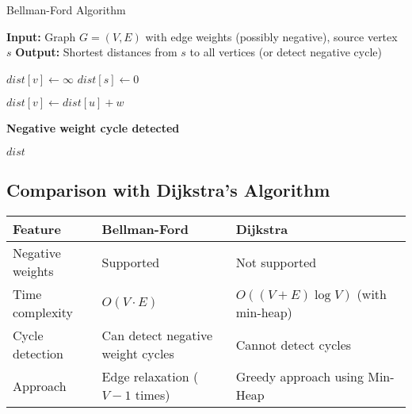 \documentclass[14pt,a4paper]{extarticle}
\begin{document}
\begin{algorithm}[H]
\caption{Bellman-Ford Algorithm}
\begin{algorithmic}[1]
\State \textbf{Input:} Graph $G = (V, E)$ with edge weights (possibly negative), source vertex $s$
\State \textbf{Output:} Shortest distances from $s$ to all vertices (or detect negative cycle)

        \State $dist[v] \gets \infty$
    \EndFor
    \State $dist[s] \gets 0$

                \State $dist[v] \gets dist[u] + w$
            \EndIf
        \EndFor
    \EndFor

            \State \Return \textbf{Negative weight cycle detected}
        \EndIf
    \EndFor

    \State \Return $dist$
\EndFunction
\end{algorithmic}
\end{algorithm}

\subsection{Comparison with Dijkstra's Algorithm}
\begin{table}[H]
\centering
\renewcommand{\arraystretch}{1.4}
\begin{tabular}{|>{\raggedright\arraybackslash}p{4cm}|
                >{\raggedright\arraybackslash}p{5.5cm}|
                >{\raggedright\arraybackslash}p{5.5cm}|}
\hline
\textbf{Feature} & \textbf{Bellman-Ford} & \textbf{Dijkstra} \\
\hline
Negative weights & Supported & Not supported \\
\hline
Time complexity  & $O(V \cdot E)$ & $O((V + E)\log V)$ (with min-heap) \\
\hline
Cycle detection  & Can detect negative weight cycles & Cannot detect cycles \\
\hline
Approach         & Edge relaxation ($V - 1$ times) & Greedy approach using Min-Heap \\
\hline
\end{tabular}
\end{table}

\end{document}
